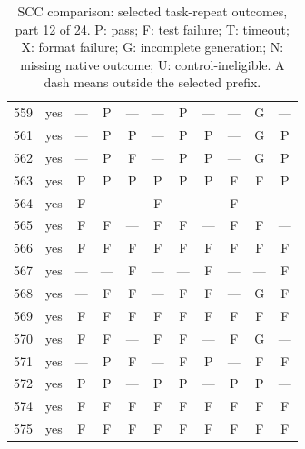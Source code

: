 \begin{table}[p]
\begin{tabular*}{\textwidth}{@{\extracolsep{\fill}}rc*{9}{c}@{}}
559 & yes & — & P & — & — & P & — & — & G & —\\
561 & yes & — & P & P & — & P & P & — & G & P\\
562 & yes & — & P & F & — & P & P & — & G & P\\
563 & yes & P & P & P & P & P & P & F & F & P\\
564 & yes & F & — & — & F & — & — & F & — & —\\
565 & yes & F & F & — & F & F & — & F & F & —\\
566 & yes & F & F & F & F & F & F & F & F & F\\
567 & yes & — & — & F & — & — & F & — & — & F\\
568 & yes & — & F & F & — & F & F & — & G & F\\
569 & yes & F & F & F & F & F & F & F & F & F\\
570 & yes & F & F & — & F & F & — & F & G & —\\
571 & yes & — & P & F & — & F & P & — & F & F\\
572 & yes & P & P & — & P & P & — & P & P & —\\
574 & yes & F & F & F & F & F & F & F & F & F\\
575 & yes & F & F & F & F & F & F & F & F & F\\
\bottomrule\end{tabular*}
\caption{SCC comparison: selected task-repeat outcomes, part 12 of 24. P: pass; F: test failure; T: timeout; X: format failure; G: incomplete generation; N: missing native outcome; U: control-ineligible. A dash means outside the selected prefix.}
\end{table}
\clearpage
